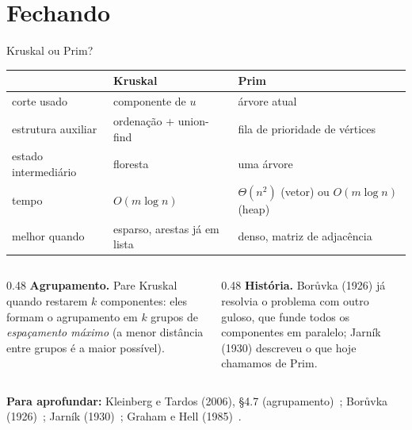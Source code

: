 \documentclass[aspectratio=169,xcolor=table]{beamer}
\newcommand{\fonte}[1]{%
  \vfill
  {\tiny\color{gray!55!black}\textbf{Para aprofundar:} #1\par}%
}
\begin{document}
\section{Fechando}

\begin{frame}{Kruskal ou Prim?}
  \begin{center}
  \scriptsize
  \begin{tabular}{lll}
    \toprule
    & Kruskal & Prim \\
    \midrule
    corte usado & componente de $u$ & árvore atual \\
    estrutura auxiliar & ordenação + union-find & fila de prioridade de vértices \\
    estado intermediário & floresta & uma árvore \\
    tempo & $O(m \log n)$ & $\Theta(n^2)$ (vetor) ou $O(m \log n)$ (heap) \\
    melhor quando & esparso, arestas já em lista & denso, matriz de adjacência \\
    \bottomrule
  \end{tabular}
  \end{center}
  \medskip
  \begin{columns}[T]
    \begin{column}{0.48\textwidth}
      \scriptsize
      \textbf{Agrupamento.} Pare Kruskal quando restarem $k$ componentes: eles formam o
      agrupamento em $k$ grupos de \emph{espaçamento máximo} (a menor distância entre grupos
      é a maior possível).
    \end{column}
    \begin{column}{0.48\textwidth}
      \scriptsize
      \textbf{História.} Borůvka (1926) já resolvia o problema com outro guloso, que funde
      todos os componentes em paralelo; Jarník (1930) descreveu o que hoje chamamos de Prim.
    \end{column}
  \end{columns}
  \fonte{Kleinberg e Tardos (2006), \S 4.7 (agrupamento)~\cite{kleinberg2006algorithm};
    Borůvka (1926)~\cite{boruvka1926jistem}; Jarník (1930)~\cite{jarnik1930jistem};
    Graham e Hell (1985)~\cite{graham1985history}.}
\end{frame}
\end{document}
